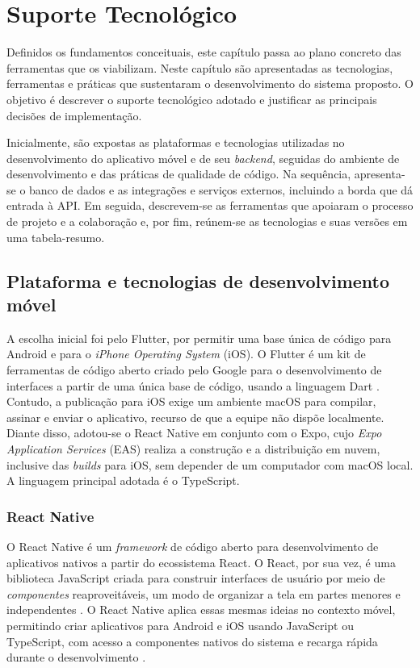 \chapter{Suporte Tecnológico}
    \label{cap:suporte-tecnologico}

    Definidos os fundamentos conceituais, este capítulo passa ao plano concreto das ferramentas que os viabilizam. Neste capítulo são apresentadas as tecnologias, ferramentas e práticas que sustentaram o desenvolvimento do sistema proposto. O objetivo é descrever o suporte tecnológico adotado e justificar as principais decisões de implementação.

    Inicialmente, são expostas as plataformas e tecnologias utilizadas no desenvolvimento do aplicativo móvel e de seu \textit{backend}, seguidas do ambiente de desenvolvimento e das práticas de qualidade de código. Na sequência, apresenta-se o banco de dados e as integrações e serviços externos, incluindo a borda que dá entrada à API. Em seguida, descrevem-se as ferramentas que apoiaram o processo de projeto e a colaboração e, por fim, reúnem-se as tecnologias e suas versões em uma tabela-resumo.

    \section{Plataforma e tecnologias de desenvolvimento móvel}
        A escolha inicial foi pelo Flutter, por permitir uma base única de código para Android e para o \textit{iPhone Operating System} (iOS). O Flutter é um kit de ferramentas de código aberto criado pelo Google para o desenvolvimento de interfaces a partir de uma única base de código, usando a linguagem Dart \cite{flutter_docs}. Contudo, a publicação para iOS exige um ambiente macOS para compilar, assinar e enviar o aplicativo, recurso de que a equipe não dispõe localmente. Diante disso, adotou-se o React Native em conjunto com o Expo, cujo \textit{Expo Application Services} (EAS) realiza a construção e a distribuição em nuvem, inclusive das \textit{builds} para iOS, sem depender de um computador com macOS local. A linguagem principal adotada é o TypeScript.

        \subsection{React Native}
        O React Native é um \textit{framework} de código aberto para desenvolvimento de aplicativos nativos a partir do ecossistema React. O React, por sua vez, é uma biblioteca JavaScript criada para construir interfaces de usuário por meio de \textit{componentes} reaproveitáveis, um modo de organizar a tela em partes menores e independentes \cite{react_docs}. O React Native aplica essas mesmas ideias no contexto móvel, permitindo criar aplicativos para Android e iOS usando JavaScript ou TypeScript, com acesso a componentes nativos do sistema e recarga rápida durante o desenvolvimento \cite{reactnative_docs}.

